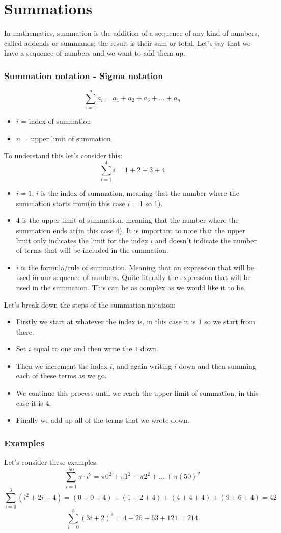 



\section{Summations}
In mathematics, summation is the addition of a sequence of any kind of numbers, called addends or summands; the result is their sum or total. 
Let's say that we have a sequence of numbers and we want to add them up.

\subsubsection{Summation notation - Sigma notation}
$$  \sum_{i=1}^{n} a_i = a_1 + a_2 + a_3 + \ldots + a_n $$
\begin{itemize}
  \item $ i $ = index of summation
  \item $ n $ = upper limit of summation
\end{itemize}
To understand this let's consider this: 
$$ \sum_{i=1}^{4} i = 1 + 2 + 3 + 4$$
\begin{itemize}
  \item $ i = 1 $, $ i $ is the index of summation, meaning that the number where the summation starts from(in this case $ i = 1 $ so $1$).
  \item $ 4 $ is the upper limit of summation, meaning that the number where the summation ends at(in this case $ 4 $). It is important to note that the upper limit only indicates the limit for the index $i$ and doesn't indicate the number of terms that will be included in the summation.
  \item $ i $ is the formula/rule of summation. Meaning that an expression that will be used in our sequence of numbers. Quite literally the expression that will be used in the summation. This can be as complex as we would like it to be.
\end{itemize}

Let's break down the steps of the summation notation:
\begin{itemize}
  \item Firstly we start at whatever the index is, in this case it is $1$ so we start from there. 
  \item Set $i$ equal to one and then write the $1$ down. 
  \item Then we increment the index $i$, and again writing $i$ down and then summing each of these terms as we go.
  \item We continue this process until we reach the upper limit of summation, in this case it is $4$.
  \item Finally we add up all of the terms that we wrote down.
\end{itemize}

\subsubsection{Examples}
Let's consider these examples:
$$ \sum_{i = 1}^{50} \pi \cdot i^2  = \pi0^2 + \pi1^2 + \pi2^2 + \ldots + \pi(50)^2$$
$$ \sum_{i = 0}^{3} (i^2 + 2i + 4) = (0 + 0 + 4) + (1+2+4) + (4+4+4) + (9+6+4) = 42$$
$$ \sum_{i = 0}^{3} (3i + 2)^2 = 4+25+63+121 = 214$$
